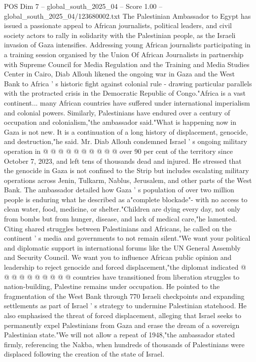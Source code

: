 \begin{textsample}{POS Dim 7 – global\_south\_2025\_04 – Score 1.00 – global\_south\_2025\_04/123680002.txt}  \label{ex:f7_pos_148}
The Palestinian Ambassador to Egypt has issued a passionate appeal to African journalists, political leaders, and civil society actors to rally in solidarity with the Palestinian people, as the Israeli invasion of Gaza intensifies.
Addressing young African journalists participating in a training session organised by the Union Of African Journalists in partnership with Supreme Council for Media Regulation and the Training and Media Studies Center in Cairo, Diab Allouh likened the ongoing war in Gaza and the West Bank to Africa ' s historic fight against colonial rule - drawing particular parallels with the protracted crisis in the Democratic Republic of Congo."Africa is a vast continent... many African countries have suffered under international imperialism and colonial powers.
Similarly, Palestinians have endured over a century of occupation and colonialism,"the ambassador said."What is happening now in Gaza is not new.
It is a continuation of a long history of displacement, genocide, and destruction,"he said.
Mr.
Diab Allouh condemned Israel ' s ongoing military operation in @ @ @ @ @ @ @ @ @ @ over 90 per cent of the territory since October 7, 2023, and left tens of thousands dead and injured.
He stressed that the genocide in Gaza is not confined to the Strip but includes escalating military operations across Jenin, Tulkarm, Nablus, Jerusalem, and other parts of the West Bank.
The ambassador detailed how Gaza ' s population of over two million people is enduring what he described as a"complete blockade"- with no access to clean water, food, medicine, or shelter."Children are dying every day, not only from bombs but from hunger, disease, and lack of medical care,"he lamented.
Citing shared struggles between Palestinians and Africans, he called on the continent ' s media and governments to not remain silent."We want your political and diplomatic support in international forums like the UN General Assembly and Security Council.
We want you to influence African public opinion and leadership to reject genocide and forced displacement,"the diplomat indicated @ @ @ @ @ @ @ @ @ @ countries have transitioned from liberation struggles to nation-building, Palestine remains under occupation.
He pointed to the fragmentation of the West Bank through 770 Israeli checkpoints and expanding settlements as part of Israel ' s strategy to undermine Palestinian statehood.
He also emphasised the threat of forced displacement, alleging that Israel seeks to permanently expel Palestinians from Gaza and erase the dream of a sovereign Palestinian state."We will not allow a repeat of 1948,"the ambassador stated firmly, referencing the Nakba, when hundreds of thousands of Palestinians were displaced following the creation of the state of Israel.

\end{textsample}
